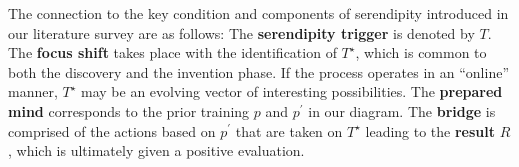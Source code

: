 The connection to the key condition and components of serendipity
introduced in our literature survey are as follows:
%
The \textbf{serendipity trigger} is denoted by $T$.
%
The \textbf{focus shift} takes place with the identification of
$T^\star$, which is common to both the discovery and the invention
phase.  If the process operates in an ``online'' manner, $T^\star$ may
be an evolving vector of interesting possibilities.
%
The \textbf{prepared mind} corresponds to the prior training $p$ and
$p^{\prime}$ in our diagram.
%
%
The \textbf{bridge} is comprised of the actions based on $p^{\prime}$
that are taken on $T^\star$ leading to the \textbf{result} $R$, which is ultimately given a positive evaluation.

